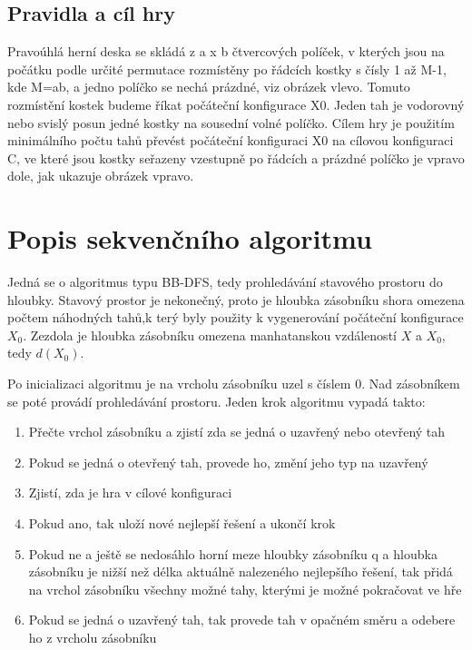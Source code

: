 \documentclass[12pt]{article}
\begin{document}
\subsection{Pravidla a cíl hry}

Pravoúhlá herní deska se skládá z a x b čtvercových políček, v kterých jsou na počátku podle určité permutace rozmístěny po řádcích kostky s čísly 1 až M-1, kde M=ab, a jedno políčko se nechá prázdné, viz obrázek vlevo. Tomuto rozmístění kostek budeme říkat počáteční konfigurace X0. Jeden tah je vodorovný nebo svislý posun jedné kostky na sousední volné políčko. Cílem hry je použitím minimálního počtu tahů převést počáteční konfiguraci X0 na cílovou konfiguraci C, ve které jsou kostky seřazeny vzestupně po řádcích a prázdné políčko je vpravo dole, jak ukazuje obrázek vpravo.

\section{Popis sekvenčního algoritmu}

Jedná se o algoritmus typu BB-DFS, tedy prohledávání stavového prostoru do hloubky. Stavový prostor je nekonečný, proto je hloubka zásobníku shora omezena počtem náhodných tahů,k terý byly použity k vygenerování počáteční konfigurace $X_0$. Zezdola je hloubka zásobníku omezena manhatanskou vzdáleností $X$ a $X_0$, tedy $d(X_0)$.

Po inicializaci algoritmu je na vrcholu zásobníku uzel s číslem 0. Nad zásobníkem se poté provádí prohledávání prostoru. Jeden krok algoritmu vypadá takto:

\begin{enumerate}
\item Přečte vrchol zásobníku a zjistí zda se jedná o uzavřený nebo otevřený tah
\item Pokud se jedná o otevřený tah, provede ho, změní jeho typ na uzavřený
\item Zjistí, zda je hra v cílové konfiguraci
\item Pokud ano, tak uloží nové nejlepší řešení a ukončí krok
\item Pokud ne a ještě se nedosáhlo horní meze hloubky zásobníku q a hloubka zásobníku je nižší než délka aktuálně nalezeného nejlepšího řešení, tak přidá na vrchol zásobníku všechny možné tahy, kterými je možné pokračovat ve hře
\item Pokud se jedná o uzavřený tah, tak provede tah v opačném směru a odebere ho z vrcholu zásobníku
\end{enumerate}
\end{document}
